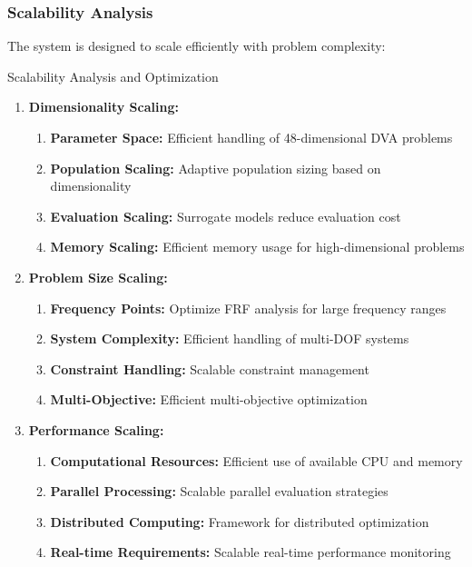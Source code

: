 \documentclass[12pt,a4paper]{article}
\begin{document}
\subsubsection{Scalability Analysis}

The system is designed to scale efficiently with problem complexity:

\begin{algorithm}
\caption{Scalability Analysis and Optimization}
\begin{enumerate}
    \item \textbf{Dimensionality Scaling:}
    \begin{enumerate}
        \item \textbf{Parameter Space:} Efficient handling of 48-dimensional DVA problems
        \item \textbf{Population Scaling:} Adaptive population sizing based on dimensionality
        \item \textbf{Evaluation Scaling:} Surrogate models reduce evaluation cost
        \item \textbf{Memory Scaling:} Efficient memory usage for high-dimensional problems
    \end{enumerate}
    \item \textbf{Problem Size Scaling:}
    \begin{enumerate}
        \item \textbf{Frequency Points:} Optimize FRF analysis for large frequency ranges
        \item \textbf{System Complexity:} Efficient handling of multi-DOF systems
        \item \textbf{Constraint Handling:} Scalable constraint management
        \item \textbf{Multi-Objective:} Efficient multi-objective optimization
    \end{enumerate}
    \item \textbf{Performance Scaling:}
    \begin{enumerate}
        \item \textbf{Computational Resources:} Efficient use of available CPU and memory
        \item \textbf{Parallel Processing:} Scalable parallel evaluation strategies
        \item \textbf{Distributed Computing:} Framework for distributed optimization
        \item \textbf{Real-time Requirements:} Scalable real-time performance monitoring
    \end{enumerate}
\end{enumerate}
\end{algorithm}
\end{document}

